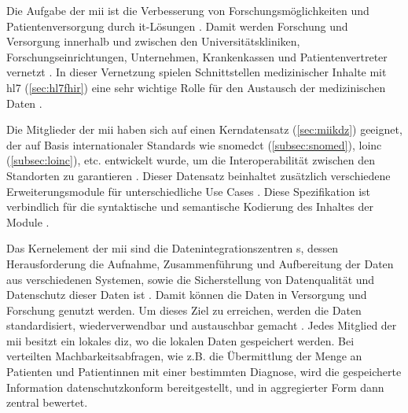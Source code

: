 Die Aufgabe der \ac{mii} ist die Verbesserung von Forschungsmöglichkeiten und Patientenversorgung durch \acs{it}-Lösungen \cite{mii}. Damit werden Forschung und Versorgung innerhalb und zwischen den Universitätskliniken, Forschungseinrichtungen, Unternehmen, Krankenkassen und Patientenvertreter vernetzt \cite{telemedizin, mii}. In dieser Vernetzung spielen Schnittstellen medizinischer Inhalte mit \acs{hl7} (\ref{sec:hl7fhir}) eine sehr wichtige Rolle für den Austausch der medizinischen Daten \cite{telemedizin}. 

Die Mitglieder der \ac{mii} haben sich auf einen Kerndatensatz (\ref{sec:miikdz}) geeignet, der auf Basis internationaler Standards wie \ac{snomedct} (\ref{subsec:snomed}), \ac{loinc} (\ref{subsec:loinc}), etc. entwickelt wurde, um die Interoperabilität zwischen den Standorten zu garantieren \cite{telemedizin, miikdz}. Dieser Datensatz beinhaltet zusätzlich verschiedene Erweiterungsmodule für unterschiedliche Use Cases \cite{mii}. Diese Spezifikation ist verbindlich für die syntaktische und semantische Kodierung des Inhaltes der Module \cite{icukdz}.

Das Kernelement der \ac{mii} sind die Datenintegrationszentren s, dessen Herausforderung die Aufnahme, Zusammenführung und Aufbereitung der Daten aus verschiedenen Systemen, sowie die Sicherstellung von Datenqualität und Datenschutz dieser Daten ist \cite{mii, diz}. Damit können die Daten in Versorgung und Forschung genutzt werden. Um dieses Ziel zu erreichen, werden die Daten standardisiert, wiederverwendbar und austauschbar gemacht \cite{diz}. Jedes Mitglied der \ac{mii} besitzt ein lokales \ac{diz}, wo die lokalen Daten gespeichert werden. Bei verteilten Machbarkeitsabfragen, wie z.B. die Übermittlung der Menge an Patienten und Patientinnen mit einer bestimmten Diagnose, wird die gespeicherte Information datenschutzkonform bereitgestellt, und in aggregierter Form dann zentral bewertet.